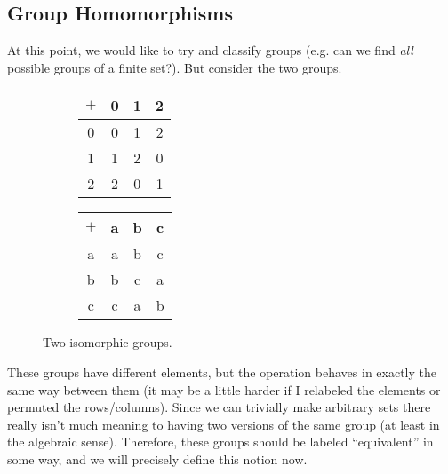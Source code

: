\subsection{Group Homomorphisms}

  At this point, we would like to try and classify groups (e.g. can we find \textit{all} possible groups of a finite set?). But consider the two groups. 

  \begin{figure}[H]
    \centering
    \begin{subfigure}[b]{0.48\textwidth}
      \centering
      \begin{tabular}{c|ccc}
        \hline
        $+$ & 0 & 1 & 2 \\
        \hline
        0 & 0 & 1 & 2 \\
        1 & 1 & 2 & 0 \\
        2 & 2 & 0 & 1 \\
        \hline
      \end{tabular}
    \end{subfigure}
    \hfill 
    \begin{subfigure}[b]{0.48\textwidth}
      \centering
      \begin{tabular}{c|ccc}
        \hline
        $+$ & a & b & c \\
        \hline
        a & a & b & c \\
        b & b & c & a \\
        c & c & a & b \\
        \hline
      \end{tabular}
    \end{subfigure}
    \caption{Two isomorphic groups.}
  \end{figure} 

  These groups have different elements, but the operation behaves in exactly the same way between them (it may be a little harder if I relabeled the elements or permuted the rows/columns). Since we can trivially make arbitrary sets there really isn't much meaning to having two versions of the same group (at least in the algebraic sense). Therefore, these groups should be labeled ``equivalent'' in some way, and we will precisely define this notion now. 


